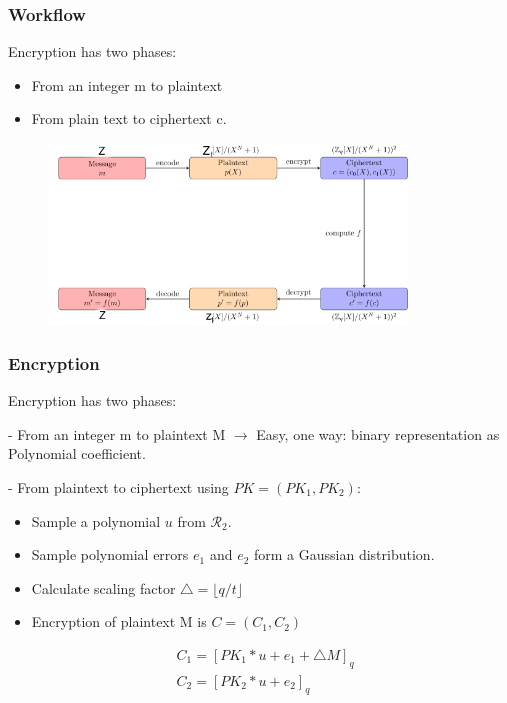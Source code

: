 \documentclass[10pt,handout]{beamer}
\begin{document}
\begin{frame}[noframenumbering]
\frametitle{Workflow}

    Encryption has two phases:
\begin{itemize}
    \item From an integer m to plaintext
    \item From plain text to ciphertext c.
\end{itemize}


\begin{figure}
    \includegraphics[width=0.85\textwidth]{bfv-diagram.png}
\end{figure}


\end{frame}


\begin{frame}[noframenumbering]

    \frametitle{Encryption}

    Encryption has two phases:

    - From an integer m to plaintext M $\rightarrow$ Easy, one way: binary representation as Polynomial coefficient.

    - From plaintext to ciphertext using $PK = (PK_1, PK_2)$:

    \begin{itemize}
        \item Sample a polynomial $u$ from $\mathcal{R}_2$.
        \item Sample polynomial errors $e_1$ and $e_2$ form a Gaussian distribution.
        \item Calculate scaling factor $\triangle = \lfloor q/t\rfloor $
        \item Encryption of plaintext M is $C=(C_1, C_2)$
    \end{itemize}
    \begin{align}
        &C_1 = [PK_1 * u + e_1 + \triangle M ]_q\nonumber \\
        &C_2 = [PK_2 * u + e_2]_q\nonumber
    \end{align}


\end{frame}
\end{document}
